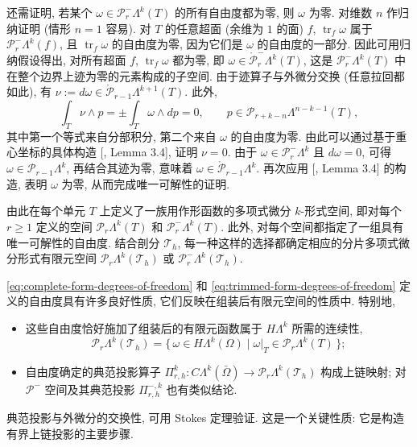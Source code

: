 {还需证明, 若某个 $\omega\in\mathcal P_r^-\Lambda^k(T)$ 的所有自由度都为零, 则 $\omega$ 为零. 对维数 $n$ 作归纳证明 (情形 $n=1$ 容易). 对 $T$ 的任意超面 (余维为 $1$ 的面) $f$, $\operatorname{tr}_f\omega$ 属于 $\mathcal P_r^-\Lambda^k(f)$, 且 $\operatorname{tr}_f\omega$ 的自由度为零, 因为它们是 $\omega$ 的自由度的一部分. 因此可用归纳假设得出, 对所有超面 $f$, $\operatorname{tr}_f\omega$ 都为零, 即 $\omega\in\mathring{\mathcal P}_r^-\Lambda^k(T)$, 这是 $\mathcal P_r^-\Lambda^k(T)$ 中在整个边界上迹为零的元素构成的子空间. 由于迹算子与外微分交换 (任意拉回都如此), 有 $\nu:=d\omega\in\mathring{\mathcal P}_{r-1}\Lambda^{k+1}(T)$. 此外,}
\[
\int_T\nu\wedge p=\pm\int_T\omega\wedge dp=0,\qquad p\in\mathcal P_{r+k-n}\Lambda^{n-k-1}(T),
\]
{其中第一个等式来自分部积分, 第二个来自 $\omega$ 的自由度为零. 由此可以通过基于重心坐标的具体构造 [, Lemma 3.4], 证明 $\nu=0$. 由于 $\omega\in\mathcal P_r^-\Lambda^k$ 且 $d\omega=0$, 可得 $\omega\in\mathcal P_{r-1}\Lambda^k$, 再结合其迹为零, 意味着 $\omega\in\mathring{\mathcal P}_{r-1}\Lambda^k$. 再次应用 [, Lemma 3.4] 的构造, 表明 $\omega$ 为零, 从而完成唯一可解性的证明.}

{由此在每个单元 $T$ 上定义了一族用作形函数的多项式微分 $k$-形式空间, 即对每个 $r\geq1$ 定义的空间 $\mathcal P_r\Lambda^k(T)$ 和 $\mathcal P_r^-\Lambda^k(T)$. 此外, 对每个空间都指定了一组具有唯一可解性的自由度. 结合剖分 $\mathcal T_h$, 每一种这样的选择都确定相应的分片多项式微分形式有限元空间 $\mathcal P_r\Lambda^k(\mathcal T_h)$ 或 $\mathcal P_r^-\Lambda^k(\mathcal T_h)$.}

{\eqref{eq:complete-form-degrees-of-freedom} 和 \eqref{eq:trimmed-form-degrees-of-freedom} 定义的自由度具有许多良好性质, 它们反映在组装后有限元空间的性质中. 特别地,}
\begin{itemize}
\item{这些自由度恰好施加了组装后的有限元函数属于 $H\Lambda^k$ 所需的连续性,}
\[
\mathcal P_r\Lambda^k(\mathcal T_h)=\{\,\omega\in H\Lambda^k(\Omega)\mid\omega|_T\in\mathcal P_r\Lambda^k(T)\,\};
\]
\item{自由度确定的典范投影算子 $\Pi_{r,h}^k:C\Lambda^k(\bar\Omega)\to\mathcal P_r\Lambda^k(\mathcal T_h)$ 构成上链映射; 对 $\mathcal P^-$ 空间及其典范投影 $\Pi_{r,h}^{-,k}$ 也有类似结论.}
\end{itemize}

{典范投影与外微分的交换性, 可用 Stokes 定理验证. 这是一个关键性质: 它是构造有界上链投影的主要步骤.}
